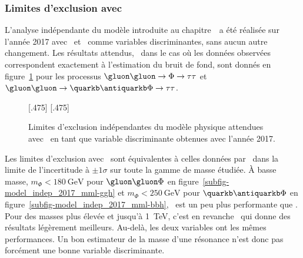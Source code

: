 \subsubsection{Limites d'exclusion avec \mml}
L'analyse indépendante du modèle introduite au chapitre~\ a été réalisée
sur l'année 2017
avec \mTtot\ et \mml\ comme variables discriminantes,
sans aucun autre changement.
Les résultats attendus,
\ie\ dans le cas où les données observées correspondent exactement à l'estimation du bruit de fond,
sont donnés en figure~\ref{fig-model_indep_2017_mml}
pour les processus $\gluon\gluon\to\Phi\to\tau\tau$ et $\gluon\gluon\to\quarkb\antiquarkb\Phi\to\tau\tau$.
\begin{figure}[h]
\centering

[.475\textwidth]
{}
\hfill
{}[.475\textwidth]
{}


\caption{Limites d'exclusion indépendantes du modèle physique attendues avec \mml\ en tant que variable discriminante obtenues avec l'année 2017.}
\label{fig-model_indep_2017_mml}
\end{figure}
\par
Les limites d'exclusion avec \mml\ sont équivalentes à celles données par \mTtot\
dans la limite de l'incertitude à $\pm1\sigma$
sur toute la gamme de masse étudiée.
À basse masse,
$m_\Phi<\SI{180}{\GeV}$ pour $\gluon\gluon\Phi$ en figure~\ref{subfig-model_indep_2017_mml-ggh}
et
$m_\Phi<\SI{250}{\GeV}$ pour $\quarkb\antiquarkb\Phi$ en figure~\ref{subfig-model_indep_2017_mml-bbh},
\mml\ est un peu plus performante que \mTtot.
Pour des masses plus élevée et jusqu'à \SI{1}{\TeV},
c'est en revanche \mTtot\ qui donne des résultats légèrement meilleurs.
Au-delà, les deux variables ont les mêmes performances.
Un bon estimateur de la masse d'une résonance n'est donc pas forcément une bonne variable discriminante.

